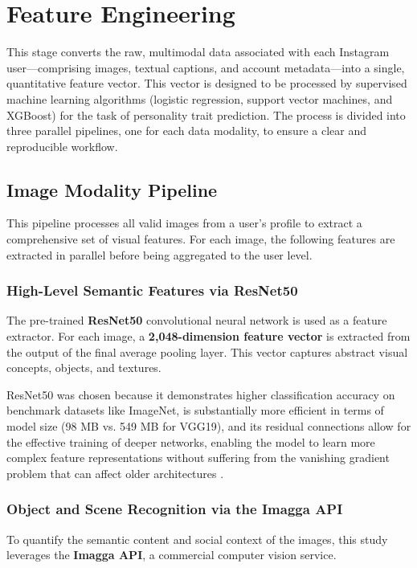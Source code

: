 

\section{Feature Engineering}
\label{subsec:features}
This stage converts the raw, multimodal data associated with each Instagram user—comprising images, textual captions, and account metadata—into a single, quantitative feature vector. This vector is designed to be processed by supervised machine learning algorithms (logistic regression, support vector machines, and XGBoost) for the task of personality trait prediction. The process is divided into three parallel pipelines, one for each data modality, to ensure a clear and reproducible workflow.

\subsection{Image Modality Pipeline}
This pipeline processes all valid images from a user's profile to extract a comprehensive set of visual features. For each image, the following features are extracted in parallel before being aggregated to the user level.

\subsubsection{High-Level Semantic Features via ResNet50}
The pre-trained \textbf{ResNet50} convolutional neural network is used as a feature extractor. For each image, a \textbf{2,048-dimension feature vector} is extracted from the output of the final average pooling layer. This vector captures abstract visual concepts, objects, and textures.

ResNet50 was chosen because it demonstrates higher classification accuracy on benchmark datasets like ImageNet, is substantially more efficient in terms of model size (98 MB vs. 549 MB for VGG19), and its residual connections allow for the effective training of deeper networks, enabling the model to learn more complex feature representations without suffering from the vanishing gradient problem that can affect older architectures \citep{he2015, simonyan2014very}.

\subsubsection{Object and Scene Recognition via the Imagga API}
To quantify the semantic content and social context of the images, this study leverages the \textbf{Imagga API}, a commercial computer vision service.

